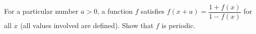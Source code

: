 For a particular number $a>0$, a function $f$ satisfies $f(x+a)=\dfrac{1+f(x)}{1-f(x)}$ for all $x$ (all values involved are defined). Show that $f$ is periodic.
